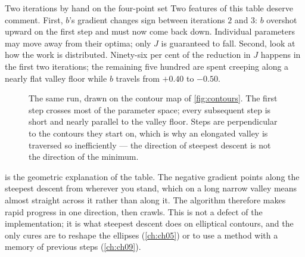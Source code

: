 \begin{workedexample}{Two iterations by hand on the four-point set}
Two features of this table deserve comment. First, $b$'s gradient changes sign
between iterations $2$ and $3$: $b$ overshot upward on the first step and must
now come back down. Individual parameters may move away from their optima; only
$J$ is guaranteed to fall. Second, look at how the work is distributed.
Ninety-six per cent of the reduction in $J$ happens in the first two iterations;
the remaining five hundred are spent creeping along a nearly flat valley floor
while $b$ travels from $+0.40$ to $-0.50$.
\end{workedexample}

\begin{figure}[htbp]
  \centering
  \caption{The same run, drawn on the contour map of \cref{fig:contours}. The
  first step crosses most of the parameter space; every subsequent step is short
  and nearly parallel to the valley floor. Steps are perpendicular to the
  contours they start on, which is why an elongated valley is traversed so
  inefficiently --- the direction of steepest descent is not the direction of
  the minimum.}
  \label{fig:gd-path}
\end{figure}

 is the geometric explanation of the table. The negative
gradient points along the steepest descent from wherever you stand, which on a
long narrow valley means almost straight across it rather than along it. The
algorithm therefore makes rapid progress in one direction, then crawls. This is
not a defect of the implementation; it is what steepest descent does on
elliptical contours, and the only cures are to reshape the ellipses
(\cref{ch:ch05}) or to use a method with a memory of previous steps
(\cref{ch:ch09}).

